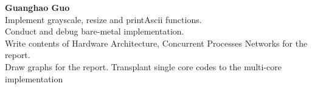 \documentclass[conference,compsoc]{IEEEtran}
\begin{document}
    \textbf{Guanghao Guo}\\
   Implement grayscale, resize and printAscii functions.\\
   Conduct and debug bare-metal implementation.\\
   Write contents of Hardware Architecture, Concurrent Processes Networks for the report.\\
   Draw graphs for the report.
   Transplant single core codes to the multi-core implementation
    
    
    
    
    
    
    
    
    
    
    
    
    
    
\end{document}
